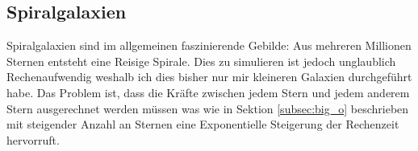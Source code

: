 %
%
%
%
%
%
%
%
%
%
%
%

\subsection{Spiralgalaxien}

Spiralgalaxien sind im allgemeinen faszinierende Gebilde: Aus mehreren Millionen
Sternen entsteht eine Reisige Spirale. Dies zu simulieren ist jedoch unglaublich
Rechenaufwendig weshalb ich dies bisher nur mir kleineren Galaxien durchgeführt
habe. Das Problem ist, dass die Kräfte zwischen jedem Stern und jedem anderem
Stern ausgerechnet werden müssen was wie in Sektion \ref{subsec:big_o} beschrieben
mit steigender Anzahl an Sternen eine Exponentielle Steigerung der Rechenzeit
hervorruft.

